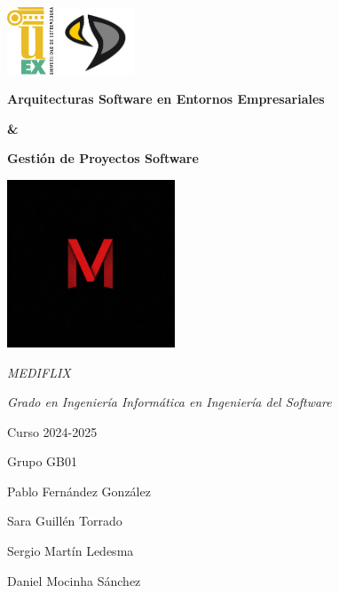 \documentclass[../main.tex]{subfiles}
\begin{document}
\begin{titlepage}
	\centering
	\includegraphics[height=2cm]{uex.png} \hfill \includegraphics[height=2cm]{epcc.jpg}
	\vfill
	{\Large \textbf{Arquitecturas Software en Entornos Empresariales} \par}
    {\Large \textbf{ \& } \par}
    {\Large \textbf{Gestión de Proyectos Software} \par}
    
    \vfill
    \includegraphics[height=5cm]{mediflix-logo.jpeg}
    \vfill
	{\Huge \textit{MEDIFLIX} \par}
	\vspace{3 cm}
	\vfill
 
	{\large \textit{Grado en Ingeniería Informática en Ingeniería del Software} \par}
	{\large Curso 2024-2025 \par}
	\vfill
    \vfill
	{\Large Grupo GB01 \par}
    {\large Pablo Fernández González \par}
    {\large Sara Guillén Torrado \par}
    {\large Sergio Martín Ledesma \par}
    {\large Daniel Mocinha Sánchez \par}
\end{titlepage}
\end{document}
